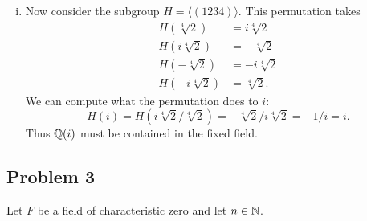 \documentclass{../../mathnotes}
\begin{document}
\begin{enumerate}[(i)]
    \item Now consider the subgroup $H=\langle(1234)\rangle$. This permutation takes
        \begin{align*}
            H(\sqrt[4]{2})&=i\sqrt[4]{2}\\
            H(i\sqrt[4]{2})&=-\sqrt[4]{2}\\
            H(-\sqrt[4]{2})&=-i\sqrt[4]{2}\\
            H(-i\sqrt[4]{2})&=\sqrt[4]{2}.
        \end{align*}
        We can compute what the permutation does to $i$:
        \[H(i)=H(i\sqrt[4]{2}/\sqrt[4]{2})=-\sqrt[4]{2}/i\sqrt[4]{2}=-1/i=i.\]
        Thus $\mathbb{Q}(i)$ must be contained in the fixed field. 
\end{enumerate}

\subsection*{Problem 3}

Let $F$ be a field of characteristic zero and let $n\in\mathbb{N}$.
\end{document}
